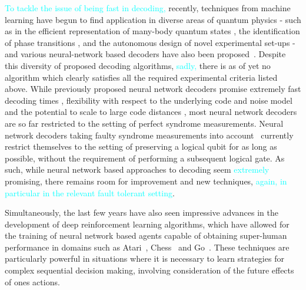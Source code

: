 \documentclass[twocolumn,preprintnumbers,amsmath,amssymb,notitlepage,nofootinbib,longbibliography,superscriptaddress,aps,pra,10pt]{revtex4-1}
\newcommand{\je}[1]{\textcolor{cyan}{#1}}
\begin{document}
	\je{To tackle the issue of being fast in decoding,} recently, techniques from machine learning have begun to find application in diverse areas of quantum physics - such as in the efficient representation of many-body quantum states \cite{WFcarleo2017solving,WFcarleo2018constructing,WFgao2017efficient}, the identification of phase transitions \cite{PTvan2017learning,PTPhysRevB.97.134109,PTcarrasquilla2017machine}, and the autonomous design of novel experimental set-ups \cite{melnikov2018active} - and various neural-network based decoders have also been proposed~\cite{Torlai10, Varsamopoulos17, Krastanov17, Breuckmann18, Baireuther18a, Baireuther18b, Ni18, chamberland2018deep}.
	Despite this diversity of proposed decoding algorithms, \je{sadly,} there is as of yet no algorithm which clearly satisfies all the required experimental criteria listed above.
	While previously proposed neural network decoders promise extremely fast decoding times \cite{chamberland2018deep}, flexibility with respect to the underlying code and noise model \cite{chamberland2018deep, Breuckmann18} and the potential to scale to large code distances \cite{Ni18}, most neural network decoders are so far restricted to the setting of perfect syndrome measurements.
	Neural network decoders taking faulty syndrome measurements into account~\cite{Baireuther18a,Baireuther18b} currently restrict themselves to the setting of preserving a logical qubit for as long as possible, without the requirement of performing a subsequent logical gate.
	As such, while neural network based approaches to decoding seem \je{extremely} promising, there remains room for improvement and new techniques,
	\je{again, in particular in the relevant fault tolerant setting}.

	Simultaneously, the last few years have also seen impressive advances in the development of deep reinforcement learning algorithms, which have allowed for the training of neural network based agents capable of obtaining super-human performance in domains such as Atari~\cite{RLMnih15,RLschaul2015prioritized,RLvan2016deep,RLwang2015dueling}, Chess~\cite{RLsilver2017mastering} and Go~\cite{RLSilver2016,RLSilver17b}.
	These techniques are particularly powerful in situations where it is necessary to learn strategies for complex sequential decision making, involving consideration of the future effects of ones actions.
	
\end{document}
